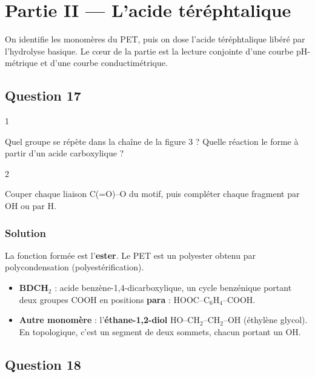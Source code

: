 \documentclass[11pt,a4paper]{article}
\providecommand{\tightlist}{\setlength{\itemsep}{0pt}\setlength{\parskip}{0pt}}
\begin{document}
\hypertarget{partie-ii-lacide-tuxe9ruxe9phtalique}{%
\section{Partie II --- L'acide téréphtalique}\label{partie-ii-lacide-tuxe9ruxe9phtalique}}

On identifie les monomères du PET, puis on dose l'acide téréphtalique libéré par l'hydrolyse basique. Le cœur de la partie est la lecture conjointe d'une courbe pH-métrique et d'une courbe conductimétrique.

\hypertarget{question-17}{%
\subsection{Question 17}\label{question-17}}

\begin{indication}{1}

Quel groupe se répète dans la chaîne de la figure 3 ? Quelle réaction le forme à partir d'un acide carboxylique ?

\end{indication}

\begin{indication}{2}

Couper chaque liaison C(=O)--O du motif, puis compléter chaque fragment par OH ou par H.

\end{indication}

\hypertarget{solution-16}{%
\subsubsection{Solution}\label{solution-16}}

La fonction formée est l'\textbf{ester}. Le PET est un polyester obtenu par polycondensation (polyestérification).

\begin{itemize}
\tightlist
\item
  \textbf{BDCH\(_2\)} : acide benzène-\allowbreak{}1,4-\allowbreak{}dicarboxylique, un cycle benzénique portant deux groupes COOH en positions \textbf{para} : HOOC--C\(_6\)H\(_4\)--COOH.
\item
  \textbf{Autre monomère} : l'\textbf{éthane-1,2-diol} HO--CH\(_2\)--CH\(_2\)--OH (éthylène glycol). En topologique, c'est un segment de deux sommets, chacun portant un OH.
\end{itemize}

\hypertarget{question-18}{%
\subsection{Question 18}\label{question-18}}
\end{document}
